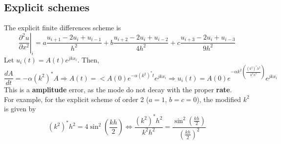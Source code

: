 \documentclass[12pt, openany]{report}
\theoremstyle{definition}
\begin{document}
\subsection{Explicit schemes}
The explicit finite differences scheme is 
\begin{equation}
	\left.\frac{\partial^2 u}{\partial x^2}\right|_i = a\frac{u_{i+1}-2u_i+u_{i-1}}{h^2} + b\frac{u_{i+2}-2u_i+u_{i-2}}{4h^2} + c\frac{u_{i+3}-2u_i+u_{i-3}}{9h^2}
\end{equation}
Let $u_i(t) = A(t) e^{jkx_i}$. Then, 
\begin{equation}
	\frac{dA}{dt} = -\alpha (k^2)^* A \Longrightarrow A(t) = <A(0)e^{-\alpha (k^2)^* t} e^{jkx_i} \Longrightarrow u_i(t) = A(0)e^{-\alpha k^2 \left(\frac{\left(k^2\right)^*h^2}{k^2 h^2}\right)}e^{jkx_i}
\end{equation}
This is a \textbf{amplitude} error, as the mode do not decay with the proper \textbf{rate}. \\
For example, for the explicit scheme of order 2 ($a=1$, $b=c=0$), the modified $k^2$ is given by
\begin{equation}
	(k^2)^*h^2 = 4\sin^2 \left(\frac{kh}{2}\right) \Longleftrightarrow \frac{(k^2)^* h^2}{k^2 h^2} = \frac{\sin^2 \left(\frac{kh}{2}\right)}{\left(\frac{kh}{2}\right)^2}
\end{equation}
\end{document}
